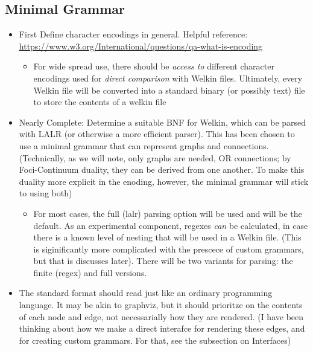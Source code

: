 \subsection{Minimal Grammar}
\begin{itemize}
	\item First Define character encodings in general. Helpful reference: \url{https://www.w3.org/International/questions/qa-what-is-encoding}
	      \begin{itemize}
		      \item For wide spread use, there should be \textit{access to} different character encodings used for \textit{direct comparison} with Welkin files. Ultimately, every Welkin file will be converted into a standard binary (or possibly text) file to store the contents of a welkin file
	      \end{itemize}
	\item Nearly Complete: Determine a suitable BNF for Welkin, which can be parsed with LALR (or otherwise a more efficient parser). This has been chosen to use a minimal grammar that can represent graphs and connections. (Technically, as we will note, only graphs are needed, OR connections; by Foci-Continuum duality, they can be derived from one another. To make this duality more explicit in the enoding, however, the minimal grammar will stick to using both)
	      \begin{itemize}
		      \item For most cases, the full (lalr) parsing option will be used and will be the default. As an experimental component, regexes \textit{can} be calculated, in case there is a known level of nesting that will be used in a Welkin file. (This is siginificantly more complicated with the prescece of custom grammars, but that is discusses later). There will be two variants for parsing: the finite (regex) and full versions.
		            \end{itemize}
		      \item The standard format should read just like an ordinary programming language. It may be akin to graphviz, but it should prioritze on the contents of each node and edge, not necessarially how they are rendered. (I have been thinking about how we make a direct interafce for rendering these edges, and for creating custom grammars. For that, see the subsection on Interfaces)
		            \begin{itemize}


\end{itemize}
\end{itemize}
